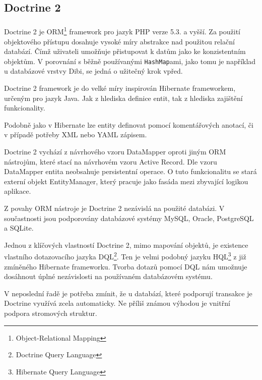 \documentclass[11pt,oneside]{fithesis}
\begin{document}
        \subsection{Doctrine 2}
        \paragraph*{}
        Doctrine 2 je ORM\footnote{Object-Relational Mapping} framework pro jazyk PHP verze 5.3. a vyšší. Za použití objektového přístupu dosahuje vysoké míry abstrakce nad použitou relační databází. Čímž uživateli umožňuje přistupovat k datům jako ke konzistentním objektům. V porovnání s běžně používanými \verb|HashMap|ami, jako tomu je například u databázové vrstvy Dibi\cite{dibi}, se jedná o užitečný krok vpřed.

        Doctrine 2 framework je do velké míry inspirován Hibernate frameworkem, určeným pro jazyk Java. Jak z hlediska definice entit, tak z hlediska zajištění funkcionality.

        Podobně jako v Hibernate lze entity definovat pomocí komentářových anotací, či v případě potřeby XML nebo YAML zápisem.

        Doctrine 2 vychází z návrhového vzoru DataMapper oproti jiným ORM nástrojům, které stací na návrhovém vzoru Active Record. Dle vzoru DataMapper entita neobsahuje persistentní operace. O tuto funkcionalitu se stará externí objekt EntityManager, který pracuje jako fasáda mezi zbyvající logikou aplikace.

        Z povahy ORM nástroje je Doctrine 2 nezávislá na použité databázi. V součastnosti jsou podporovány databázové systémy MySQL, Oracle, PostgreSQL a SQLite.

        Jednou z klíčových vlastností Doctrine 2, mimo mapování objektů, je existence vlastního dotazovacího jazyka DQL\footnote{Doctrine Query Language}. Ten je velmi podobný jazyku HQL\footnote{Hibernate Query Language} z již zmíněného Hibernate frameworku. Tvorba dotazů pomocí DQL nám umožnuje dosáhnout úplné nezávislosti na používaném databázovém systému.

        V neposlední řadě je potřeba zmínit, že u databází, které podporují transakce je Doctrine využívá zcela automaticky. Ne příliš známou výhodou je vnitřní podpora stromových struktur.
\end{document}
